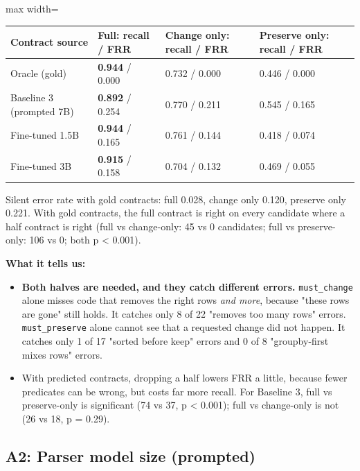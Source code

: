 \documentclass[11pt]{article}
\providecommand{\tightlist}{\setlength{\itemsep}{0pt}\setlength{\parskip}{0pt}}
\begin{document}
\begin{table}[!tp]
\centering\footnotesize\setlength{\tabcolsep}{3pt}\renewcommand{\arraystretch}{1.1}
\begin{adjustbox}{max width=\textwidth}\begin{tabular}{llll}
\toprule
\textbf{Contract source} & \textbf{Full: recall / FRR} & \textbf{Change only: recall / FRR} & \textbf{Preserve only: recall / FRR} \\
\midrule
Oracle (gold) & \textbf{0.944} / 0.000 & 0.732 / 0.000 & 0.446 / 0.000 \\
Baseline 3 (prompted 7B) & \textbf{0.892} / 0.254 & 0.770 / 0.211 & 0.545 / 0.165 \\
Fine-tuned 1.5B & \textbf{0.944} / 0.165 & 0.761 / 0.144 & 0.418 / 0.074 \\
Fine-tuned 3B & \textbf{0.915} / 0.158 & 0.704 / 0.132 & 0.469 / 0.055 \\
\bottomrule
\end{tabular}\end{adjustbox}
\end{table}

Silent error rate with gold contracts: full 0.028, change only 0.120,
preserve only 0.221. With gold contracts, the full contract is right on
every candidate where a half contract is right (full vs change-only: 45
vs 0 candidates; full vs preserve-only: 106 vs 0; both p \textless{}
0.001).

\textbf{What it tells us:}

\begin{itemize}
\tightlist
\item
  \textbf{Both halves are needed, and they catch different errors.}
  \texttt{must\_\allowbreak{}change} alone misses code that removes the
  right rows \emph{and more}, because "these rows are gone" still holds.
  It catches only 8 of 22 "removes too many rows" errors.
  \texttt{must\_\allowbreak{}preserve} alone cannot see that a requested
  change did not happen. It catches only 1 of 17 "sorted before keep"
  errors and 0 of 8 "groupby-first mixes rows" errors.
\item
  With predicted contracts, dropping a half lowers FRR a little, because
  fewer predicates can be wrong, but costs far more recall. For Baseline
  3, full vs preserve-only is significant (74 vs 37, p \textless{}
  0.001); full vs change-only is not (26 vs 18, p = 0.29).
\end{itemize}

\subsection{A2: Parser model size (prompted)}
\end{document}
